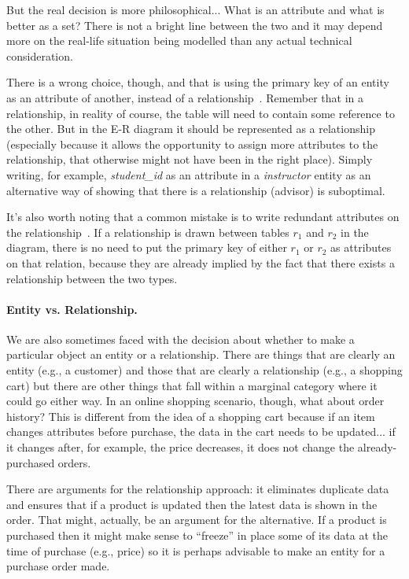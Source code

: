 But the real decision is more philosophical... What is an attribute and what is better as a set? There is not a bright line between the two and it may depend more on the real-life situation being modelled than any actual technical consideration.

There is a wrong choice, though, and that is using the primary key of an entity as an attribute of another, instead of a relationship~\cite{dsc}. Remember that in a relationship, in reality of course, the table will need to contain some reference to the other. But in the E-R diagram it should be represented as a relationship (especially because it allows the opportunity to assign more attributes to the relationship, that otherwise might not have been in the right place). Simply writing, for example, \textit{student\_id} as an attribute in a \textit{instructor} entity as an alternative way of showing that there is a relationship (advisor) is suboptimal.

It's also worth noting that a common mistake is to write redundant attributes on the relationship~\cite{dsc}. If a relationship is drawn between tables $r_{1}$ and $r_{2}$ in the diagram, there is no need to put the primary key of either $r_{1}$ or $r_{2}$ as attributes on that relation, because they are already implied by the fact that there exists a relationship between the two types. 

\paragraph{Entity vs. Relationship.} We are also sometimes faced with the decision about whether to make a particular object an entity or a relationship. There are things that are clearly an entity (e.g., a customer) and those that are clearly a relationship (e.g., a shopping cart) but there are other things that fall within a marginal category where it could go either way. In an online shopping scenario, though, what about order history? This is different from the idea of a shopping cart because if an item changes attributes before purchase, the data in the cart needs to be updated... if it changes after, for example, the price decreases, it does not change the already-purchased orders.

There are arguments for the relationship approach: it eliminates duplicate data and ensures that if a product is updated then the latest data is shown in the order. That might, actually, be an argument for the alternative. If a product is purchased then it might make sense to ``freeze'' in place some of its data at the time of purchase (e.g., price) so it is perhaps advisable to make an entity for a purchase order made. 

